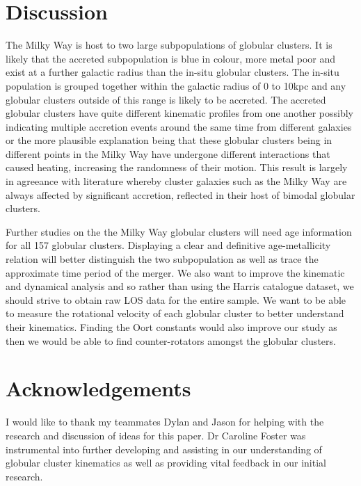 \documentclass[fleqn,usenatbib]{mnras}
\begin{document}
\section{Discussion}
The Milky Way is host to two large subpopulations of globular clusters. It is likely that the accreted 
subpopulation is blue in colour, more metal poor and exist at a further galactic radius than the in-situ 
globular clusters. The in-situ population is grouped together within the galactic radius of 0 to 10kpc and 
any globular clusters outside of this range is likely to be accreted. The accreted globular clusters have quite 
different kinematic profiles from one another possibly indicating multiple accretion events around the same time 
from different galaxies or the more plausible explanation being that these globular clusters being in different 
points in the Milky Way have undergone different interactions that caused heating, increasing the randomness of 
their motion. This result is largely in agreeance with literature \citep{Gebhardt_1999} whereby cluster galaxies 
such as the Milky Way are always affected by significant accretion, reflected in their host of bimodal globular 
clusters.

Further studies on the the Milky Way globular clusters will need age information for all 157 globular clusters.
Displaying a clear and definitive age-metallicity relation will better distinguish the two subpopulation as well 
as trace the approximate time period of the merger. We also want to improve the kinematic and dynamical analysis 
and so rather than using the Harris catalogue dataset, we should strive to obtain raw LOS data for the entire 
sample. We want to be able to measure the rotational velocity of each globular cluster to better understand their 
kinematics. Finding the Oort constants would also improve our study as then we would be able to find counter-rotators
amongst the globular clusters.

\section{Acknowledgements}
I would like to thank my teammates Dylan and Jason for helping with the research and discussion of ideas for 
this paper. Dr Caroline Foster was instrumental into further developing and assisting in our understanding of 
globular cluster kinematics as well as providing vital feedback in our initial research.

       
         

\label{lastpage}
\end{document}
